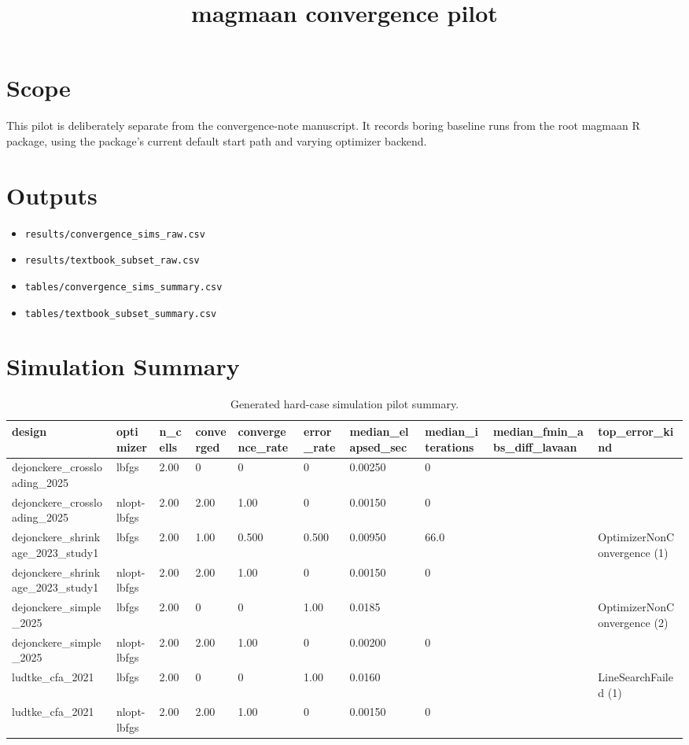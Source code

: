 \documentclass[11pt]{article}
\title{magmaan convergence pilot}
\date{}
\begin{document}
\maketitle
\section*{Scope}
This pilot is deliberately separate from the convergence-note manuscript. It records boring baseline runs from the root magmaan R package, using the package's current default start path and varying optimizer backend.
\section*{Outputs}
\begin{itemize}
\item \texttt{results/convergence\_sims\_raw.csv}
\item \texttt{results/textbook\_subset\_raw.csv}
\item \texttt{tables/convergence\_sims\_summary.csv}
\item \texttt{tables/textbook\_subset\_summary.csv}
\end{itemize}
\section*{Simulation Summary}
\begin{table}[ht]
\centering
\caption{Generated hard-case simulation pilot summary.}
\begin{tabular}{llllllllll}
\hline
design & optimizer & n\_cells & converged & convergence\_rate & error\_rate & median\_elapsed\_sec & median\_iterations & median\_fmin\_abs\_diff\_lavaan & top\_error\_kind
\\ \hline
dejonckere\_crossloading\_2025 & lbfgs & 2.00 & 0 & 0 & 0 & 0.00250 & 0 &  &  \\
dejonckere\_crossloading\_2025 & nlopt-lbfgs & 2.00 & 2.00 & 1.00 & 0 & 0.00150 & 0 &  &  \\
dejonckere\_shrinkage\_2023\_study1 & lbfgs & 2.00 & 1.00 & 0.500 & 0.500 & 0.00950 & 66.0 &  & OptimizerNonConvergence (1) \\
dejonckere\_shrinkage\_2023\_study1 & nlopt-lbfgs & 2.00 & 2.00 & 1.00 & 0 & 0.00150 & 0 &  &  \\
dejonckere\_simple\_2025 & lbfgs & 2.00 & 0 & 0 & 1.00 & 0.0185 &  &  & OptimizerNonConvergence (2) \\
dejonckere\_simple\_2025 & nlopt-lbfgs & 2.00 & 2.00 & 1.00 & 0 & 0.00200 & 0 &  &  \\
ludtke\_cfa\_2021 & lbfgs & 2.00 & 0 & 0 & 1.00 & 0.0160 &  &  & LineSearchFailed (1) \\
ludtke\_cfa\_2021 & nlopt-lbfgs & 2.00 & 2.00 & 1.00 & 0 & 0.00150 & 0 &  &  \\
\hline
\end{tabular}
\end{table}
\end{document}
